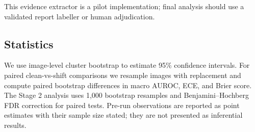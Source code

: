 This evidence extractor is a pilot implementation; final analysis should use a validated report labeller or human adjudication.

\subsection{Statistics}

We use image-level cluster bootstrap to estimate 95\% confidence intervals. For paired clean-vs-shift comparisons we resample images with replacement and compute paired bootstrap differences in macro AUROC, ECE, and Brier score. The Stage 2 analysis uses 1,000 bootstrap resamples and Benjamini--Hochberg FDR correction for paired tests. Pre-run observations are reported as point estimates with their sample size stated; they are not presented as inferential results.